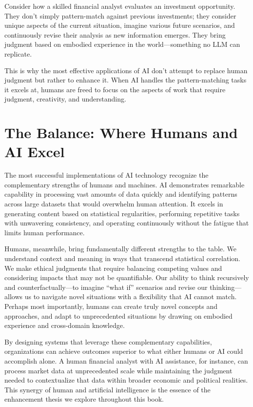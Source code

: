 \documentclass[
  Letterpaper,
]{scrbook}
\begin{document}
Consider how a skilled financial analyst evaluates an investment
opportunity. They don't simply pattern-match against previous
investments; they consider unique aspects of the current situation,
imagine various future scenarios, and continuously revise their analysis
as new information emerges. They bring judgment based on embodied
experience in the world---something no LLM can replicate.

This is why the most effective applications of AI don't attempt to
replace human judgment but rather to enhance it. When AI handles the
pattern-matching tasks it excels at, humans are freed to focus on the
aspects of work that require judgment, creativity, and understanding.

\section{The Balance: Where Humans and AI
Excel}\label{the-balance-where-humans-and-ai-excel}

The most successful implementations of AI technology recognize the
complementary strengths of humans and machines. AI demonstrates
remarkable capability in processing vast amounts of data quickly and
identifying patterns across large datasets that would overwhelm human
attention. It excels in generating content based on statistical
regularities, performing repetitive tasks with unwavering consistency,
and operating continuously without the fatigue that limits human
performance.

Humans, meanwhile, bring fundamentally different strengths to the table.
We understand context and meaning in ways that transcend statistical
correlation. We make ethical judgments that require balancing competing
values and considering impacts that may not be quantifiable. Our ability
to think recursively and counterfactually---to imagine ``what if''
scenarios and revise our thinking---allows us to navigate novel
situations with a flexibility that AI cannot match. Perhaps most
importantly, humans can create truly novel concepts and approaches, and
adapt to unprecedented situations by drawing on embodied experience and
cross-domain knowledge.

By designing systems that leverage these complementary capabilities,
organizations can achieve outcomes superior to what either humans or AI
could accomplish alone. A human financial analyst with AI assistance,
for instance, can process market data at unprecedented scale while
maintaining the judgment needed to contextualize that data within
broader economic and political realities. This synergy of human and
artificial intelligence is the essence of the enhancement thesis we
explore throughout this book.
\end{document}
